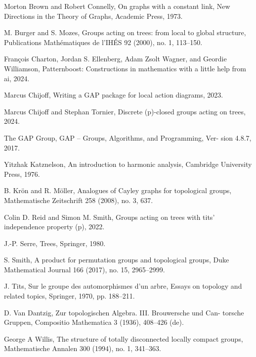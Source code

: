 \documentclass[preview]{standalone}
\begin{document}
\begin{center}
Morton Brown and Robert Connelly, On graphs with a constant link, New Directions in the Theory of Graphs, Academic Press, 1973.

M. Burger and S. Mozes, Groups acting on trees: from local to global structure, Publications Mathématiques de l’IHÉS 92 (2000), no. 1, 113–150.

François Charton, Jordan S. Ellenberg, Adam Zsolt Wagner, and Geordie Williamson, Patternboost: Constructions in mathematics with a little help from ai, 2024.

Marcus Chijoff, Writing a GAP package for local action diagrams, 2023.

Marcus Chijoff and Stephan Tornier, Discrete (p)-closed groups acting on trees, 2024.

The GAP Group, GAP – Groups, Algorithms, and Programming, Ver- sion 4.8.7, 2017.

Yitzhak Katznelson, An introduction to harmonic analysis, Cambridge University Press, 1976.

B. Krön and R. Möller, Analogues of Cayley graphs for topological groups, Mathematische Zeitschrift 258 (2008), no. 3, 637.

Colin D. Reid and Simon M. Smith, Groups acting on trees with tits’ independence property (p), 2022.

J.-P. Serre, Trees, Springer, 1980.

S. Smith, A product for permutation groups and topological groups, Duke Mathematical Journal 166 (2017), no. 15, 2965–2999.

J. Tits, Sur le groupe des automorphismes d’un arbre, Essays on topology and related topics, Springer, 1970, pp. 188–211.

D. Van Dantzig, Zur topologischen Algebra. III. Brouwersche und Can- torsche Gruppen, Compositio Mathematica 3 (1936), 408–426 (de).  

George A Willis, The structure of totally disconnected locally compact groups, Mathematische Annalen 300 (1994), no. 1, 341–363.
\end{center}
\end{document}
